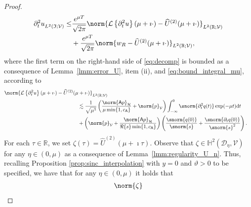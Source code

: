 \begin{proof}
\begin{equation}
\begin{aligned}
{		\partial^2_t u
	}_{L^2(\mathfrak{I};\mathcal{V})}
    \leq
    &
    \frac{
        e^{\mu T}
    }{
        \sqrt{2 \pi}
    }
    \norm{
        \mathcal{L}\left\{\partial^2_t u \right\}
        (\mu+\imath \cdot)
        -
        \widehat{U}^{(2)}(\mu+\imath\cdot)
    }_{L^2(\mathbb{R};\mathcal{V})}
    \\
    &
    +
    \frac{
        e^{\mu T}
    }{
        \sqrt{2 \pi}
    }
    \norm{
        w_R
        -
        \widehat{U}^{(2)}(\mu+\imath\cdot)
    }_{L^2(\mathbb{R};\mathcal{V})},
\end{aligned}
\end{equation}
where the first term on the right-hand side of \eqref{eq:decomp} is bounded as a
consequence of Lemma~\ref{lmm:error_U}, item (ii), and \eqref{eq:bound_integral_mu},
according to 
\begin{equation}\label{eq:error_consistency}
\begin{aligned}
    \norm{
        \mathcal{L}\left\{\partial^2_t u \right\}
        (\mu+\imath \cdot)
        -
        \widehat{U}^{(2)}(\mu+\imath\cdot)
    }_{L^2(\mathbb{R};\mathcal{V})}
    \\
    	&
	\hspace{-2cm}
    \lesssim
    \frac{1}{\sqrt{\mu^3}}
    \left(
    \frac{
        \norm{\mathsf{A}p}_{\mathcal{H}}
        }{
        \mu  \min\{1, c_{\mathsf{A}}\}
        }
        +
        \norm{p}_\mathcal{V}
    \right)
	\int_{-\infty}^{0}
	\snorm{\partial^2_t  q (t)}
	\exp(-\mu t)
	\normalfont\text{d} t
    \\
    	&
	\hspace{-2cm}
   	+
	\left(
      	\norm{p}_{\mathcal{V}}
      	+
      	\frac{
			\norm{\mathsf{A}p}_{\mathcal{H}}
		}{
			\Re\{s\}  \min\{1, c_{\mathsf{A}}\}
		}
	\right)
	\left(
		\frac{\snorm{q(0)}}{\snorm{s}}
		+
		\frac{\snorm{\partial_t q(0)}}{\snorm{s}^2}
	\right).
\end{aligned}
\end{equation}
For each $\tau \in \mathbb{R}$, we set $\zeta(\tau) = \widehat{U}^{(2)}(\mu+\imath\tau)$.
Observe that $\zeta \in \mathbb{H}^2(\mathscr{D}_{\eta },\mathcal{V})$ for any $\eta \in (0,\mu)$
as a consequence of Lemma~\ref{lmm:regularity_U_n}.
Thus, recalling Proposition \ref{prop:sinc_interpolation} with
$y = 0$ and $\vartheta>0$ to be specified, we have that for any $\eta \in (0,\mu)$ it holds that
\begin{equation}\label{eq:sinc_approx_ineq}
\begin{aligned}
    \norm{
        \zeta
}
\end{aligned}
\end{equation}
\end{proof}
